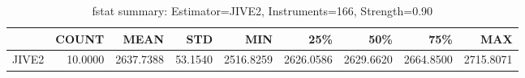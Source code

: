 \begin{table}[ht]
\centering
\caption{fstat summary: Estimator=JIVE2, Instruments=166, Strength=0.90}
\begin{tabular}{lrrrrrrrr}
\toprule
 & COUNT & MEAN & STD & MIN & 25\% & 50\% & 75\% & MAX \\
\midrule
JIVE2 & 10.0000 & 2637.7388 & 53.1540 & 2516.8259 & 2626.0586 & 2629.6620 & 2664.8500 & 2715.8071 \\
\bottomrule
\end{tabular}
\end{table}

